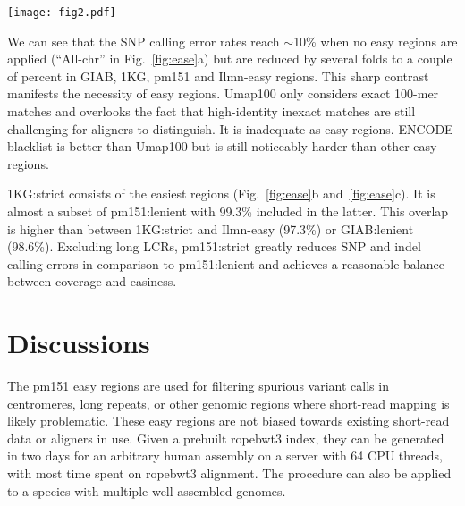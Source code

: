 \documentclass[webpdf,contemporary,large,namedate]{oup-authoring-template}%
\begin{document}
\begin{figure*}[tb]
\texttt{[image: fig2.pdf]}
\caption{Small variant calling accuracy in easy and confident regions.
{\bf (a)} SNP accuracy.
DeepVariant, Strelka2, Octopus and GATK short-read variant calls from 30X NovaSeq data were obtained from \citet{Baid2020.12.11.422022}.
Pipelup calls were made with ``{\tt minipileup -ys3 -a1 -p.25}''.
False discovery rate (FDR) and false negative rate (FNR) were calculated by RTG vcfeval~\citep{Cleary023754}
with genotype errors ignored.
``All-chr'' represents all chromosomal sequences in GRCh38 without easy regions.
{\bf (b)} SNP accuracy in high-quality easy regions.
{\bf (c)} Indel accuracy in high-quality easy regions.
Pileup indel calls are omitted due to their high error rates.
}\label{fig:ease}
\end{figure*}

We can see that the SNP calling error rates reach $\sim$10\% when no easy regions are applied (``All-chr'' in Fig.~\ref{fig:ease}a)
but are reduced by several folds to a couple of percent in GIAB, 1KG, pm151 and Ilmn-easy regions.
This sharp contrast manifests the necessity of easy regions.
Umap100 only considers exact 100-mer matches and overlooks the fact that high-identity inexact matches
are still challenging for aligners to distinguish.
It is inadequate as easy regions.
ENCODE blacklist is better than Umap100 but is still noticeably harder than other easy regions.

1KG:strict consists of the easiest regions (Fig.~\ref{fig:ease}b and~\ref{fig:ease}c).
It is almost a subset of pm151:lenient with 99.3\% included in the latter.
This overlap is higher than between 1KG:strict and Ilmn-easy (97.3\%) or GIAB:lenient (98.6\%).
Excluding long LCRs,
pm151:strict greatly reduces SNP and indel calling errors in comparison to pm151:lenient
and achieves a reasonable balance between coverage and easiness.

\section{Discussions}

The pm151 easy regions are used for filtering spurious variant calls in centromeres, long repeats,
or other genomic regions where short-read mapping is likely problematic.
These easy regions are not biased towards existing short-read data or aligners in use.
Given a prebuilt ropebwt3 index, they can be generated in two days for an arbitrary human assembly on a server with 64 CPU threads, with most time spent on ropebwt3 alignment.
The procedure can also be applied to a species with multiple well assembled genomes.
\end{document}
